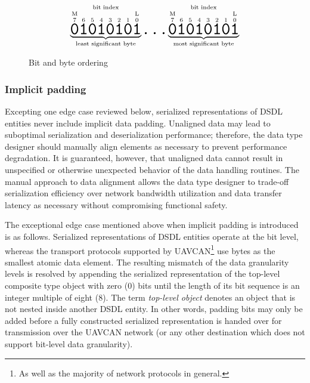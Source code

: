 \begin{figure}[H]
    $$
    \overset{\text{bit index}}{%
        \underbrace{%
            \overset{\text{M}}{\overset{7}{\hugett{0}}}
            \overset{6}{\hugett{1}}
            \overset{5}{\hugett{0}}
            \overset{4}{\hugett{1}}
            \overset{3}{\hugett{0}}
            \overset{2}{\hugett{1}}
            \overset{1}{\hugett{0}}
            \overset{\text{L}}{\overset{0}{\hugett{1}}}
        }_\text{least significant byte}%
    }
    \hugett{\ldots}
    \overset{\text{bit index}}{%
        \underbrace{%
            \overset{\text{M}}{\overset{7}{\hugett{0}}}
            \overset{6}{\hugett{1}}
            \overset{5}{\hugett{0}}
            \overset{4}{\hugett{1}}
            \overset{3}{\hugett{0}}
            \overset{2}{\hugett{1}}
            \overset{1}{\hugett{0}}
            \overset{\text{L}}{\overset{0}{\hugett{1}}}
        }_\text{most significant byte}%
    }
    $$
    \caption{Bit and byte ordering\label{fig:dsdl_serialization_bit_ordering}}
\end{figure}

\subsubsection{Implicit padding}

Excepting one edge case reviewed below,
serialized representations of DSDL entities never include implicit data padding.
Unaligned data may lead to suboptimal serialization and deserialization performance;
therefore, the data type designer should manually align elements as necessary to prevent performance degradation.
It is guaranteed, however, that unaligned data cannot result in unspecified or otherwise unexpected behavior
of the data handling routines.
The manual approach to data alignment allows the data type designer to trade-off serialization efficiency
over network bandwidth utilization and data transfer latency as necessary without compromising functional safety.

The exceptional edge case mentioned above when implicit padding is introduced is as follows.
Serialized representations of DSDL entities operate at the bit level,
whereas the transport protocols supported by UAVCAN\footnote{As well as the majority of network protocols in general.}
use bytes as the smallest atomic data element.
The resulting mismatch of the data granularity levels is resolved by
appending the serialized representation of the top-level composite type object with zero (0) bits
until the length of its bit sequence is an integer multiple of eight (8).
The term \emph{top-level object} denotes an object that is not nested inside another DSDL entity.
In other words, padding bits may only be added before a fully constructed serialized representation is
handed over for transmission over the UAVCAN network
(or any other destination which does not support bit-level data granularity).

